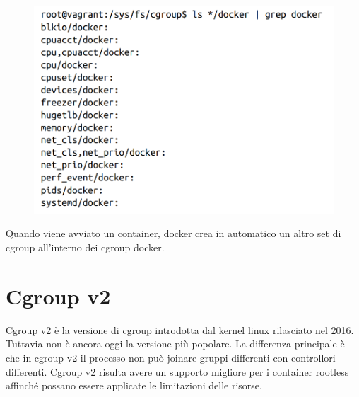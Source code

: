 \begin{figure}[H]
    \centering
    \includegraphics[width=\textwidth, keepaspectratio]{capitoli/os_security/imgs/docker1.png}
\end{figure}

Quando viene avviato un container, docker crea in automatico un altro set di cgroup
all'interno dei cgroup docker.

\section{Cgroup v2}

Cgroup v2 è la versione di cgroup introdotta dal kernel linux rilasciato nel 2016.
Tuttavia non è ancora oggi la versione più popolare. La differenza principale
è che in cgroup v2 il processo non può joinare gruppi differenti con controllori
differenti. Cgroup v2 risulta avere un supporto migliore per i container rootless
affinché possano essere applicate le limitazioni delle risorse.